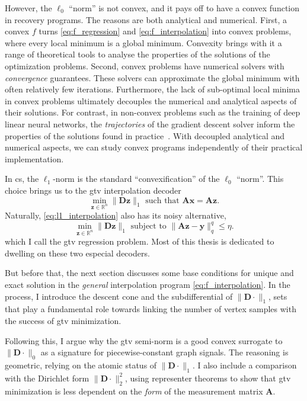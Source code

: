 However, the $\ell_0$ ``norm'' is not convex, and it pays off to have a convex function in recovery programs. The reasons are both analytical and numerical. First, a convex $f$ turns \eqref{eq:f_regression} and \eqref{eq:f_interpolation} into convex problems, where every local minimum is a global minimum. Convexity brings with it a range of theoretical tools to analyse the properties of the solutions of the optimization problems. Second, convex problems have numerical solvers with \emph{convergence} guarantees. These solvers can approximate the global minimum with often relatively few iterations. Furthermore, the lack of sub-optimal local minima in convex problems ultimately decouples the numerical and analytical aspects of their solutions. For contrast, in non-convex problems such as the training of deep linear neural networks, the \emph{trajectories} of the gradient descent solver inform the properties of the solutions found in practice~\cite{arora2018a}. With decoupled analytical and numerical aspects, we can study convex programs independently of their practical implementation.

In \acrlong{cs}, the $\ell_1$-norm is the standard ``convexification'' of the $\ell_0$ ``norm''. This choice brings us to the \acrfull{gtv} interpolation decoder
\begin{equation}
    \underset{\mathbf{z} \in \mathbb{R}^{n}}{\min} \| \mathbf{D z} \|_1 \text{ such that } \mathbf{Ax = Az} \tag{P1} \label{eq:l1_interpolation}.
\end{equation}
Naturally, \eqref{eq:l1_interpolation} also has its noisy alternative,
\begin{equation}
    \underset{\mathbf{z} \in \mathbb{R}^{n}}{\min}  \| \mathbf{D z} \|_1 \text{ subject to } \| \mathbf{Az - y} \|_q^q \leq \eta \tag{P1-$\eta$} \label{eq:l1_regression}.
\end{equation}
which I call the \acrshort{gtv} regression problem. Most of this thesis is dedicated to dwelling on these two especial decoders.

But before that, the next section discusses some base conditions for unique and exact solution in the \emph{general} interpolation program \eqref{eq:f_interpolation}. In the process, I introduce the descent cone and the subdifferential of $\|\mathbf{D} \cdot\|_1$, sets that play a fundamental role towards linking the number of vertex samples with the success of \acrshort{gtv} minimization.

Following this, I argue why the \acrshort{gtv} semi-norm is a good convex surrogate to $\|\mathbf{D} \cdot\|_0$ as a signature for piecewise-constant graph signals. The reasoning is geometric, relying on the atomic status of $\|\mathbf{D} \cdot\|_1$. I also include a comparison with the Dirichlet form $\|\mathbf{D} \cdot\|_2^2$, using representer theorems to show that \acrshort{gtv} minimization is less dependent on the \emph{form} of the measurement matrix $\mathbf{A}$.

